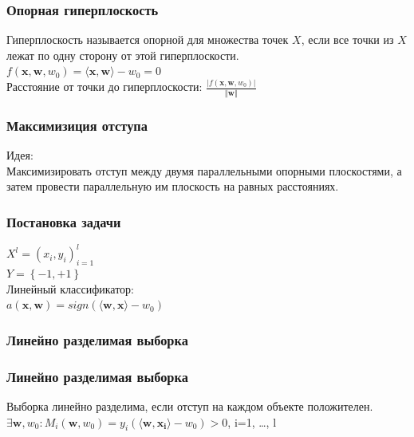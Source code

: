 \documentclass[12pt]{beamer}
\begin{document}
\begin{frame}\frametitle{Опорная гиперплоскость}
Гиперплоскость называется опорной для множества точек
$X$, если все точки из $X$ лежат по одну сторону от этой гиперплоскости.\\\vspace{5mm}
${f(\mathbf{x},\mathbf{w}, w_0) = \langle \mathbf{x}, \mathbf{w}\rangle - w_0 = 0}$\\
\vspace{5mm}
Расстояние от точки до гиперплоскости:
$\frac{\vert f(\mathbf{x},\mathbf{w}, w_0) \vert}{\Vert \mathbf{w} \Vert}$
\end{frame}

\begin{frame}\frametitle{Максимизиция отступа}
Идея:\\
Максимизировать отступ между двумя параллельными опорными плоскостями, а затем провести параллельную им плоскость на равных расстояниях.\\
\end{frame}

\begin{frame}\frametitle{Постановка задачи}
${X^l = (x_i,y_i)_{i = 1}^l}$\\ 
${Y=\left\{-1,+1\right\}}$\\
\vspace{5mm}
Линейный классификатор:\\
$a(\mathbf{x}, \mathbf{w}) = sign(\langle \mathbf{w}, \mathbf{x}\rangle - w_0)$\\
\end{frame}


\begin{frame}\frametitle{Линейно разделимая выборка}
\end{frame}

\begin{frame}\frametitle{Линейно разделимая выборка}
Выборка линейно разделима, если отступ на каждом объекте положителен.\\
\vspace{5mm}
$\exists \mathbf{w}, w_0 : M_i(\mathbf{w}, w_0) = y_i  (\langle \mathbf{w}, \mathbf{x_i} \rangle - w_0) > 0$, i=1, \dots , l\\
\end{frame}
\end{document}
